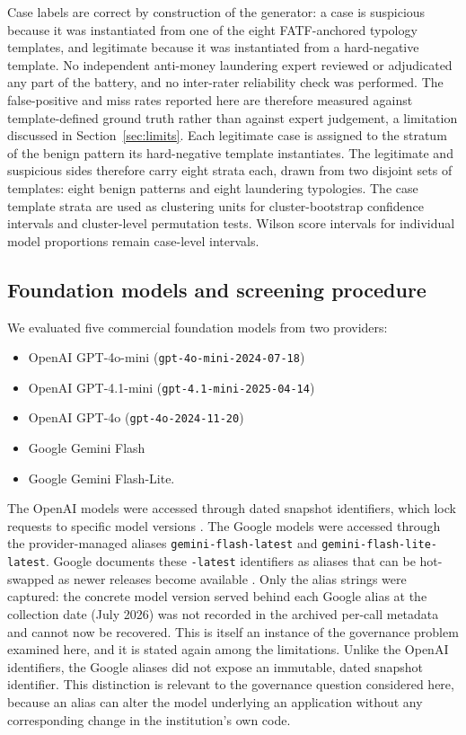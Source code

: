\documentclass[pdflatex,sn-basic,Numbered]{sn-jnl}
\begin{document}
Case labels are correct by construction of the generator: a case is suspicious because it was instantiated from one of the eight FATF-anchored typology templates, and legitimate because it was instantiated from a hard-negative template. No independent anti-money laundering expert reviewed or adjudicated any part of the battery, and no inter-rater reliability check was performed. The false-positive and miss rates reported here are therefore measured against template-defined ground truth rather than against expert judgement, a limitation discussed in Section~\ref{sec:limits}. Each legitimate case is assigned to the stratum of the benign pattern its hard-negative template instantiates. The legitimate and suspicious sides therefore carry eight strata each, drawn from two disjoint sets of templates: eight benign patterns and eight laundering typologies. The case template strata are used as clustering units for cluster-bootstrap confidence intervals and cluster-level permutation tests. Wilson score intervals for individual model proportions remain case-level intervals.

\subsection{Foundation models and screening procedure}\label{sec:design}

We evaluated five commercial foundation models from two providers:

\begin{itemize}
\item OpenAI GPT-4o-mini (\texttt{gpt-4o-mini-2024-07-18})
\item OpenAI GPT-4.1-mini (\texttt{gpt-4.1-mini-2025-04-14})
\item OpenAI GPT-4o (\texttt{gpt-4o-2024-11-20})
\item Google Gemini Flash
\item Google Gemini Flash-Lite.
\end{itemize}

The OpenAI models were accessed through dated snapshot identifiers, which lock requests to specific model versions \cite{openai-models}. The Google models were accessed through the provider-managed aliases \texttt{gemini-flash-latest} and \texttt{gemini-flash-lite-latest}. Google documents these \texttt{-latest} identifiers as aliases that can be hot-swapped as newer releases become available \cite{google-models}. Only the alias strings were captured: the concrete model version served behind each Google alias at the collection date (July 2026) was not recorded in the archived per-call metadata and cannot now be recovered. This is itself an instance of the governance problem examined here, and it is stated again among the limitations. Unlike the OpenAI identifiers, the Google aliases did not expose an immutable, dated snapshot identifier. This distinction is relevant to the governance question considered here, because an alias can alter the model underlying an application without any corresponding change in the institution's own code.
\end{document}
